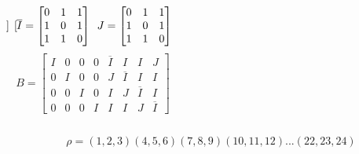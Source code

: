 \documentclass{beamer}
\begin{document}
\begin{frame}
\begin{columns}
{\[\begin{bmatrix}
                    \end{bmatrix}
                    \mkern9mu
                \overline{I} = \begin{bmatrix}
                        0 & 1 & 1 \\
                        1 & 0 & 1 \\
                        1 & 1 & 0 
                    \end{bmatrix}
                    \mkern9mu
                J = \begin{bmatrix}
                        0 & 1 & 1 \\
                        1 & 0 & 1 \\
                        1 & 1 & 0 
                    \end{bmatrix}
            \] 
             \setlength\arraycolsep{5pt}                                    
            \[
               B = \begin{bmatrix}                             
                    I & 0 & 0 & 0 & \overline{I} & I & I & J\\  
                    0 & I & 0 & 0 & J & \overline{I} & I & I\\  
                    0 & 0 & I & 0 & I & J & \overline{I} & I\\  
                    0 & 0 & 0 & I & I & I & J & \overline{I}    
                \end{bmatrix}                                   
            \] 
           \bigbreak 
           \bigbreak 
           \bigbreak 
        }
    \end{columns}
     {
    \[
        \rho = (1,2,3)(4,5,6)(7,8,9)(10,11,12)...(22,23,24) 
    \]
}
\end{frame}
\end{document}
